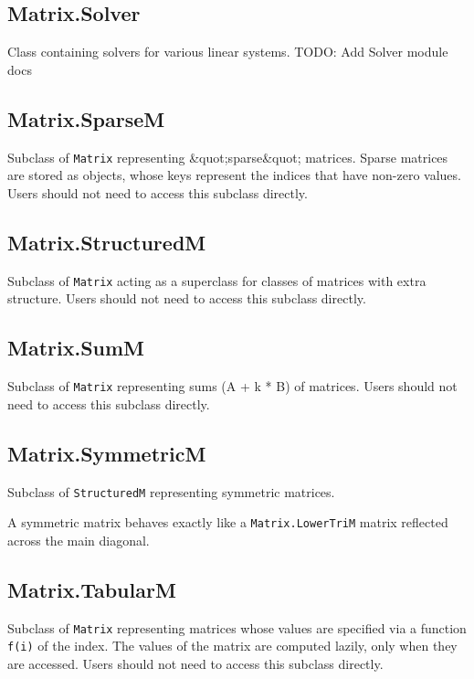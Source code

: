 \documentclass{article}
\begin{document}
    \subsection*{Matrix.Solver}
    Class containing solvers for various linear systems. TODO: Add Solver module docs


    \subsection*{Matrix.SparseM}
    Subclass of \texttt{Matrix} representing \&quot;sparse\&quot; matrices.
Sparse matrices are stored as objects, whose keys represent the indices
that have non-zero values.
Users should not need to access this subclass directly.


    \subsection*{Matrix.StructuredM}
    Subclass of \texttt{Matrix} acting as a superclass for classes of matrices
with extra structure. Users should not need to access this subclass
directly.


    \subsection*{Matrix.SumM}
    Subclass of \texttt{Matrix} representing sums (A + k * B) of matrices.
Users should not need to access this subclass directly.


    \subsection*{Matrix.SymmetricM}
    Subclass of \texttt{StructuredM} representing symmetric matrices.


A symmetric matrix behaves exactly like a \texttt{Matrix.LowerTriM} matrix reflected across the
main diagonal.


    \subsection*{Matrix.TabularM}
    Subclass of \texttt{Matrix} representing matrices whose values are specified via
a function \texttt{f(i)} of the index.
The values of the matrix are computed lazily, only when they are accessed.
Users should not need to access this subclass directly.
\end{document}
